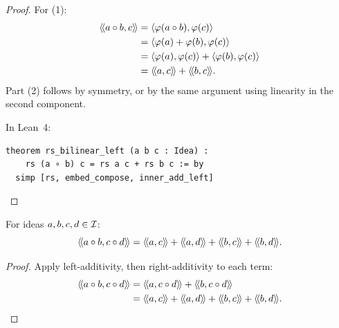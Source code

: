 \begin{proof}
For (1):
\begin{align*}
  \langle\!\langle a \circ b, c \rangle\!\rangle
  &= \langle \varphi(a \circ b), \varphi(c) \rangle \\
  &= \langle \varphi(a) + \varphi(b), \varphi(c) \rangle \\
  &= \langle \varphi(a), \varphi(c) \rangle + \langle \varphi(b), \varphi(c) \rangle \\
  &= \langle\!\langle a, c \rangle\!\rangle + \langle\!\langle b, c \rangle\!\rangle.
\end{align*}
Part (2) follows by symmetry, or by the same argument using linearity in the
second component.

In Lean~4:
\begin{lstlisting}
theorem rs_bilinear_left (a b c : Idea) :
    rs (a ∘ b) c = rs a c + rs b c := by
  simp [rs, embed_compose, inner_add_left]
\end{lstlisting}
\end{proof}

\begin{corollary}
\label{cor:resonance-compositions}
For ideas $a, b, c, d \in \mathcal{I}$:
\[
  \rs{a \compose b}{c \compose d}
  = \rs{a}{c} + \rs{a}{d} + \rs{b}{c} + \rs{b}{d}.
\]
\end{corollary}

\begin{proof}
Apply left-additivity, then right-additivity to each term:
\begin{align*}
  \rs{a \compose b}{c \compose d}
  &= \rs{a}{c \compose d} + \rs{b}{c \compose d} \\
  &= \rs{a}{c} + \rs{a}{d} + \rs{b}{c} + \rs{b}{d}.
\end{align*}
\end{proof}

